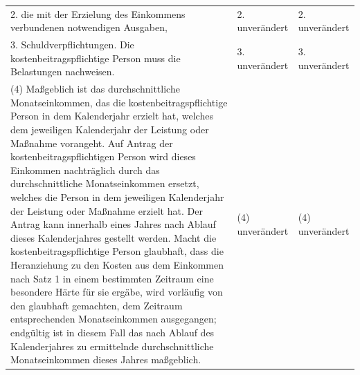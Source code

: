 \documentclass[10pt,a4paper,landscape]{article}
\begin{document}
\begin{longtable}{|L{8.2cm}|L{8.2cm}|L{8.2cm}|}
\hhline{|---|}
2.   \newline die mit der Erzielung des Einkommens  \newline verbundenen notwendigen Ausgaben, & 2. unverändert & 2. unverändert \\
\hhline{|---|}
3.   \newline Schuldverpflichtungen. Die  \newline kostenbeitragspflichtige Person muss die  \newline Belastungen nachweisen. & 3. unverändert & 3. unverändert \\
\hhline{|---|}
(4) Maßgeblich ist das durchschnittliche  \newline Monatseinkommen, das die  \newline kostenbeitragspflichtige Person in dem  \newline Kalenderjahr erzielt hat, welches dem  \newline jeweiligen Kalenderjahr der Leistung oder  \newline Maßnahme vorangeht. Auf Antrag der  \newline kostenbeitragspflichtigen Person wird  \newline dieses Einkommen nachträglich durch das  \newline durchschnittliche Monatseinkommen  \newline ersetzt, welches die Person in dem  \newline jeweiligen Kalenderjahr der Leistung oder  \newline Maßnahme erzielt hat. Der Antrag kann  \newline innerhalb eines Jahres nach Ablauf dieses  \newline Kalenderjahres gestellt werden. Macht die  \newline kostenbeitragspflichtige Person glaubhaft,  \newline dass die Heranziehung zu den Kosten aus  \newline dem Einkommen nach Satz 1 in einem  \newline bestimmten Zeitraum eine besondere Härte  \newline für sie ergäbe, wird vorläufig von den  \newline glaubhaft gemachten, dem Zeitraum  \newline entsprechenden Monatseinkommen  \newline ausgegangen; endgültig ist in diesem Fall  \newline das nach Ablauf des Kalenderjahres zu  \newline ermittelnde durchschnittliche  \newline Monatseinkommen dieses Jahres  \newline maßgeblich. & (4) unverändert & (4) unverändert \\

\end{longtable}
\end{document}
